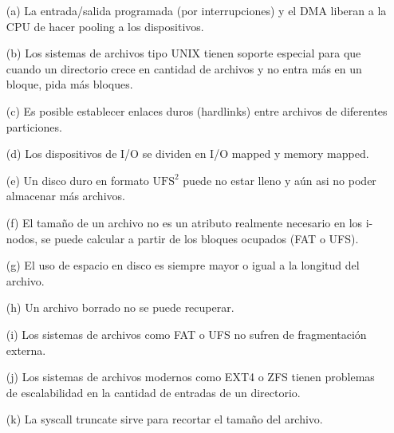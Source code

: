 \documentclass[12pt]{article}
\begin{document}
\begin{itemize}
    \item[(a)] La entrada/salida programada (por interrupciones) y el DMA liberan a la CPU de hacer pooling a los dispositivos.
    \item[(b)] Los sistemas de archivos tipo UNIX tienen soporte especial para que cuando un directorio crece en cantidad de archivos y no entra más en un bloque, pida más bloques.
    \item[(c)] Es posible establecer enlaces duros (hardlinks) entre archivos de diferentes particiones.
    \item[(d)] Los dispositivos de I/O se dividen en I/O mapped y memory mapped.
    \item[(e)] Un disco duro en formato $\mathrm{UFS}^{2}$ puede no estar lleno y aún asi no poder almacenar más archivos.    
    \item[(f)] El tamaño de un archivo no es un atributo realmente necesario en los i-nodos, se puede calcular a partir de los bloques ocupados (FAT o UFS).
    \item[(g)] El uso de espacio en disco es siempre mayor o igual a la longitud del archivo.
    \item[(h)] Un archivo borrado no se puede recuperar.
    \item[(i)] Los sistemas de archivos como FAT o UFS no sufren de fragmentación externa.
    \item[(j)] Los sistemas de archivos modernos como EXT4 o ZFS tienen problemas de escalabilidad en la cantidad de entradas de un directorio.
    \item[(k)] La syscall truncate sirve para recortar el tamaño del archivo.    
\end{itemize}
\end{document}
